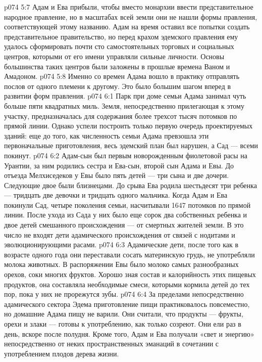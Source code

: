 \vs p074 5:7 Адам и Ева прибыли, чтобы вместо монархии ввести представительное народное правление, но в масштабах всей земли они не нашли формы правления, соответствующей этому названию. Адам на время оставил все попытки создать представительное правительство, но перед крахом эдемского правления ему удалось сформировать почти сто самостоятельных торговых и социальных центров, которыми от его имени управляли сильные личности. Основы большинства таких центров были заложены в прошлые времена Ваном и Амадоном.
\vs p074 5:8 Именно со времен Адама вошло в практику отправлять послов от одного племени к другому. Это было большим шагом вперед в развитии форм правления.
\vs p074 6:1 Парк при доме семьи Адама занимал чуть больше пяти квадратных миль. Земля, непосредственно прилегающая к этому участку, предназначалась для содержания более трехсот тысяч потомков по прямой линии. Однако успели построить только первую очередь проектируемых зданий: еще до того, как численность семьи Адама превзошла эти первоначальные приготовления, весь эдемский план был нарушен, а Сад --- всеми покинут.
\vs p074 6:2 \pc Адам\hyp{}сын был первым новорожденным фиолетовой расы на Урантии, за ним родились сестра и Ева\hyp{}сын, второй сын Адама и Евы. До отъезда Мелхиседеков у Евы было пять детей --- три сына и две дочери. Следующие двое были близнецами. До срыва Ева родила шестьдесят три ребенка --- тридцать две девочки и тридцать одного мальчика. Когда Адам и Ева покинули Сад, четыре поколения семьи, насчитывали 1647 потомков по прямой линии. После ухода из Сада у них было еще сорок два собственных ребенка и двое детей смешанного происхождения --- от смертных жителей земли. В это число не входят дети адамического происхождения от связей с нодитами и эволюционирующими расами.
\vs p074 6:3 Адамические дети, после того как в возрасте одного года они переставали сосать материнскую грудь, не употребляли молока животных. В распоряжении Евы было молоко самых разнообразных орехов, соки многих фруктов. Хорошо зная состав и калорийность этих пищевых продуктов, она составляла необходимые смеси, которыми кормила детей до тех пор, пока у них не прорежутся зубы.
\vs p074 6:4 За пределами непосредственно адамического сектора Эдема приготовление пищи практиковалось повсеместно, но домашние Адама пищу не варили. Они считали, что продукты --- фрукты, орехи и злаки --- готовы к употреблению, как только созреют. Они ели раз в день, вскоре после полудня. Кроме того, Адам и Ева получали «свет и энергию» непосредственно от неких пространственных эманаций в сочетании с употреблением плодов дерева жизни.
